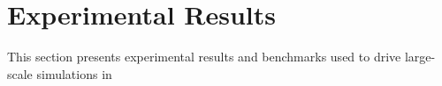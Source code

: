 \section{Experimental Results}

\label{sec:eval}



This section presents experimental results and benchmarks used to drive large-scale simulations in 






